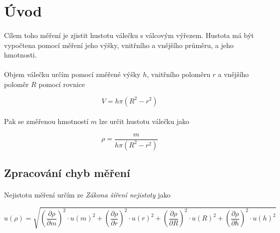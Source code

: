 \documentclass[a4paper,11pt]{article}
\begin{document}
\section{Úvod}

    \paragraph{} Cílem toho měření je zjistit hustotu válečku s válcovým výřezem. 
    Hustota má být vypočtena pomocí měření jeho výšky, vnitřního a vnějšího průměru, a
    jeho hmotnosti.

    \paragraph{} Objem válečku určím pomocí změřené výšky $h$, vnitřního poloměru $r$ a
    vnějšího poloměr $R$ pomocí rovnice

    \begin{equation}
    V = h \pi (R^{2} - r^{2})
    \end{equation}

    \paragraph{} Pak se změřenou hmotností $m$ lze určit hustotu válečku jako

    \begin{equation}
    \rho = \frac{m}{h \pi (R^{2} - r^{2})}
    \end{equation}

    \subsection{Zpracování chyb měření}

        \paragraph{} Nejistotu měření určím ze \textit{Zákona šíření nejistoty} jako

        \begin{equation}
        u(\rho) = \sqrt{
          \left(\frac{\partial \rho}{\partial m}\right)^{2} \cdot u(m)^{2}
        + \left(\frac{\partial \rho}{\partial r}\right)^{2} \cdot u(r)^{2} 
        + \left(\frac{\partial \rho}{\partial R}\right)^{2} \cdot u(R)^{2}
        + \left(\frac{\partial \rho}{\partial h}\right)^{2} \cdot u(h)^{2}
        }
        \end{equation}
\end{document}
